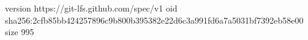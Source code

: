 version https://git-lfs.github.com/spec/v1
oid sha256:2cfb85bb424257896c9b800b395382e22d6c3a991fd6a7a5031bf7392eb58e00
size 995
